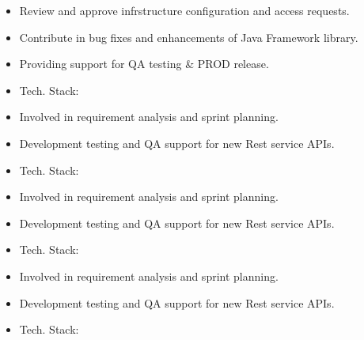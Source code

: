 \documentclass[10pt,a4paper,ragged2e,withhyper]{altacv}
\begin{document}
\begin{paracol}{2}

\begin{itemize}
\item Review and approve infrstructure configuration and access requests.
\item Contribute in bug fixes and enhancements of Java Framework library.
\item Providing support for QA testing \& PROD release.
\item Tech. Stack:      
\end{itemize}

\divider

\begin{itemize}
\item Involved in requirement analysis and sprint planning.
\item Development testing and QA support for new Rest service APIs.
\item Tech. Stack:     
\end{itemize}

\divider

\begin{itemize}
  \item Involved in requirement analysis and sprint planning.
  \item Development testing and QA support for new Rest service APIs.
  \item Tech. Stack:     
\end{itemize}

\divider

\begin{itemize}
  \item Involved in requirement analysis and sprint planning.
  \item Development testing and QA support for new Rest service APIs.
  \item Tech. Stack:     
\end{itemize}


\end{paracol}
\end{document}
